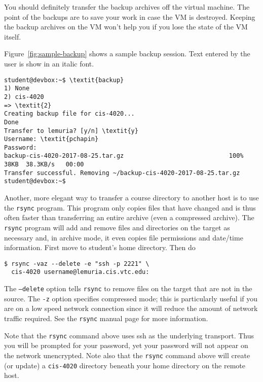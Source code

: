 \documentclass[twocolumn]{article}
\begin{document}
You should definitely transfer the backup archives off the virtual machine. The point of the
backups are to save your work in case the VM is destroyed. Keeping the backup archives on the VM
won't help you if you lose the state of the VM itself.

Figure~\ref{fig:sample-backup} shows a sample backup session. Text entered by the user is show
in an italic font.

\begin{figure*}[t]
\begin{Verbatim}[fontsize=\small, frame=single, commandchars=\\\{\}]
student@devbox:~$ \textit{backup}
1) None
2) cis-4020
=> \textit{2}
Creating backup file for cis-4020...
Done
Transfer to lemuria? [y/n] \textit{y}
Username: \textit{pchapin}
Password: 
backup-cis-4020-2017-08-25.tar.gz                             100%   38KB  38.3KB/s   00:00    
Transfer successful. Removing ~/backup-cis-4020-2017-08-25.tar.gz
student@devbox:~$
\end{Verbatim}
\caption{Sample Backup Session}
\label{fig:sample-backup}
\end{figure*}

Another, more elegant way to transfer a course directory to another host is to use the
\texttt{rsync} program. This program only copies files that have changed and is thus often
faster than transferring an entire archive (even a compressed archive). The \texttt{rsync}
program will add and remove files and directories on the target as necessary and, in archive
mode, it even copies file permissions and date/time information. First move to student's home
directory. Then do
\begin{Verbatim}
$ rsync -vaz --delete -e "ssh -p 2221" \
  cis-4020 username@lemuria.cis.vtc.edu:
\end{Verbatim}

The \texttt{--delete} option tells \texttt{rsync} to remove files on the target that are not in
the source. The \texttt{-z} option specifies compressed mode; this is particularly useful if you
are on a low speed network connection since it will reduce the amount of network traffic
required. See the \texttt{rsync} manual page for more information.

Note that the \texttt{rsync} command above uses ssh as the underlying transport. Thus you will
be prompted for your password, yet your password will not appear on the network unencrypted.
Note also that the \texttt{rsync} command above will create (or update) a \texttt{cis-4020}
directory beneath your home directory on the remote host.
\end{document}
